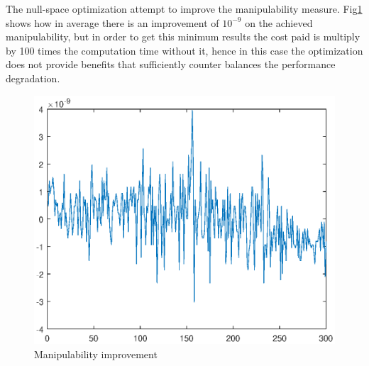 The null-space optimization attempt to improve the manipulability measure. Fig\ref{fig:manim} shows how in average there is an improvement of $10^{-9}$ on the achieved manipulability, but in order to get this minimum results the cost paid is multiply by 100 times the computation time without it, hence in this case the optimization does not provide benefits that sufficiently counter balances the performance degradation.

\begin{figure}
	\centering
	\includegraphics[width=0.8\linewidth]{img/maner}
	\caption{Manipulability improvement}
	\label{fig:manim}
\end{figure}